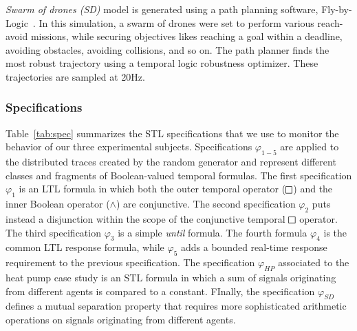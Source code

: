 \noindent \emph{Swarm of drones (SD)} model is generated using a path planning software, Fly-by-Logic~\cite{PantAM17CCTA}. In this simulation, a swarm of drones were set to perform various reach-avoid missions, while securing objectives likes reaching a goal within a deadline, avoiding obstacles, avoiding collisions, and so on. The path planner finds the most robust trajectory using a temporal logic robustness optimizer. These trajectories are sampled at 20Hz.

\subsubsection{Specifications}

Table~\ref{tab:spec} summarizes the STL specifications that we use to monitor the behavior of our three experimental subjects. Specifications $\varphi_{1-5}$ are applied to the distributed traces created by the random generator and represent different classes and fragments of Boolean-valued temporal formulas. The first specification $\varphi_1$ is an LTL formula in which both the outer temporal operator ($\LTLg$) and the inner Boolean operator ($\wedge$) are conjunctive. The second specification $\varphi_2$ puts instead a disjunction within the scope of the conjunctive temporal $\LTLg$ operator. The third specification $\varphi_3$ is a simple \emph{until} formula. The fourth formula $\varphi_4$ is the common LTL response formula, while $\varphi_5$ adds a bounded real-time response requirement to the previous specification. The specification $\varphi_{HP}$ associated to the heat pump case study is an STL formula in which a sum of signals originating from different agents is compared to a constant. FInally, the specification $\varphi_{SD}$ defines a mutual separation property that requires more sophisticated arithmetic operations on signals originating from different agents.  

